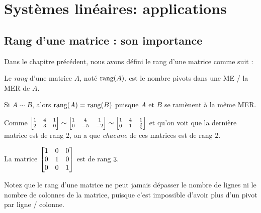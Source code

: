 \chapter{Systèmes linéaires: applications}\label{chapter:Fr_15-applications}

\section{Rang d'une matrice : son importance}

Dans le chapitre précédent, nous avons défini le rang d'une matrice comme suit :

\begin{definition}  Le \emph{rang} d'une matrice $A$, noté $\textrm{rang}(A)$, est le nombre pivots dans une ME / la MER de $A$.
\end{definition}

\begin{remark}
	Si $A\sim B$, alors $\textrm{rang}(A) = \textrm{rang}(B)$ puisque $A$ et $B$ se ramènent à la même MER.
\end{remark}

\begin{myexample} Comme  $\scriptsize\left[ \begin{matrix} 1 & 4 & 1 \\ 2 & 3 & 0 \end{matrix} \right] \sim \left[ \begin{matrix} 1 & 4 & 1 \\ 0 & -5 & -2 \end{matrix} \right] \sim \left[ \begin{matrix} 1 & 4  & 1\\ 0 & 1  & \frac25 \end{matrix} \right]$ et qu'on voit que la dernière matrice est de rang $2$, on a que \emph{chacune} de ces matrices est de rang $2$. \end{myexample}


\begin{myexample} La matrice $\left[ \begin{matrix} 1 & 0 & 0 \\ 0 & 1 & 0 \\ 0 & 0 & 1 \end{matrix} \right]$ est de rang $3$.\end{myexample}

\begin{remark}
Notez que le rang d'une matrice ne peut jamais dépasser le nombre de lignes ni le nombre de colonnes de la matrice, puisque c'est impossible d'avoir plus d'un pivot par ligne / colonne.
\end{remark}

